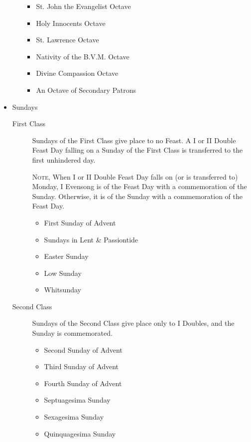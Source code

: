 \begin{itemize}
\begin{itemize}
\begin{itemize}
                    \item St. John the Evangelist Octave
                    \item Holy Innocents Octave
                    \item St. Lawrence Octave
                    \item Nativity of the B.V.M. Octave
                    \item Divine Compassion Octave
                    \item An Octave of Secondary Patrons
                \end{itemize}
        \end{itemize}
    \item Sundays
        \begin{description}
            \item[First Class] Sundays of the First Class give place to no Feast. A I or II Double Feast Day falling on a Sunday of the First Class is transferred to the first unhindered day.\par
            \textsc{Note,} When I or II Double Feast Day falls on (or is transferred to) Monday, I Evensong is of the Feast Day with a commemoration of the Sunday. Otherwise, it is of the Sunday with a commemoration of the Feast Day.
                \begin{itemize}
                    \item First Sunday of Advent
                    \item Sundays in Lent \& Passiontide
                    \item Easter Sunday
                    \item Low Sunday
                    \item Whitsunday
                \end{itemize}
            \item[Second Class] Sundays of the Second Class give place only to I Doubles, and the Sunday is commemorated.
                \begin{itemize}
                    \item Second Sunday of Advent
                    \item Third Sunday of Advent
                    \item Fourth Sunday of Advent
                    \item Septuagesima Sunday
                    \item Sexagesima Sunday
                    \item Quinquagesima Sunday

\end{itemize}
\end{description}
\end{itemize}
